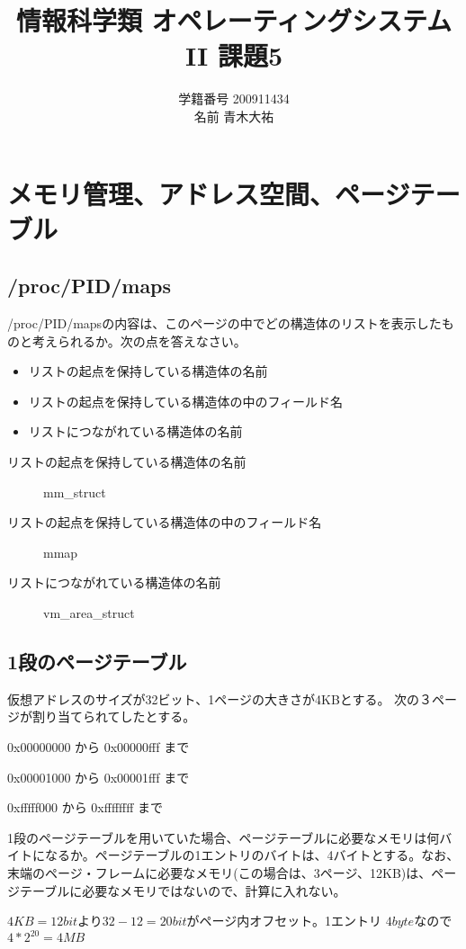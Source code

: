 \documentclass[a4j,9pt]{jsarticle}
\title{情報科学類 オペレーティングシステムII 課題5}
\author{学籍番号 200911434 \\ 名前 青木大祐}
\begin{document}
\maketitle
\setcounter{section}{4}
\section{メモリ管理、アドレス空間、ページテーブル}
\setcounter{subsection}{500}

\subsection{/proc/PID/maps}
\begin{screen}
 /proc/PID/mapsの内容は、このページの中でどの構造体のリストを表示したも
 のと考えられるか。次の点を答えなさい。
\begin{itemize}
 \item リストの起点を保持している構造体の名前
 \item リストの起点を保持している構造体の中のフィールド名
 \item リストにつながれている構造体の名前
\end{itemize}
\end{screen}

\begin{description}
 \item[リストの起点を保持している構造体の名前] {\ttfamily mm\_struct}
 \item[リストの起点を保持している構造体の中のフィールド名] {\ttfamily mmap}
 \item[リストにつながれている構造体の名前] {\ttfamily vm\_area\_struct}
\end{description}

\subsection{1段のページテーブル}
\begin{screen}

 仮想アドレスのサイズが32ビット、1ページの大きさが4KBとする。 次の３ペー
 ジが割り当てられてしたとする。

\begin{itemize}
{\ttfamily 
 \item 0x00000000 から 0x00000fff まで
 \item 0x00001000 から 0x00001fff まで
 \item 0xfffff000 から 0xffffffff まで
}
\end{itemize}
1段のページテーブルを用いていた場合、ページテーブルに必要なメモリは何バイトになるか。ページテーブルの1エントリのバイトは、4バイトとする。なお、末端のページ・フレームに必要なメモリ(この場合は、3ページ、12KB)は、ページテーブルに必要なメモリではないので、計算に入れない。
\end{screen}
$4KB = 12bit$より$32 - 12 = 20bit$がページ内オフセット。1エントリ
$4byte$なので$4 * 2^{20} = 4MB$
\end{document}
